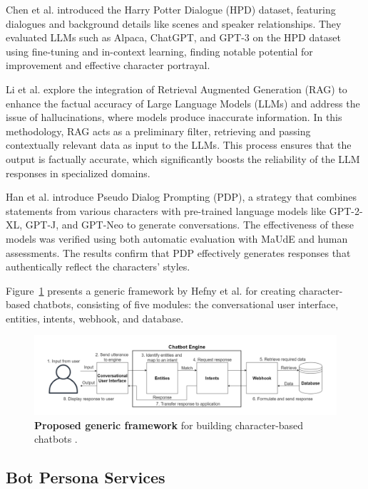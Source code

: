 \documentclass[fleqn,moreauthors,10pt]{ds_report}
\begin{document}
Chen et al. \cite{chen2023large} introduced the Harry Potter Dialogue (HPD) dataset, featuring dialogues and background details like scenes and speaker relationships. They evaluated LLMs such as Alpaca, ChatGPT, and GPT-3 on the HPD dataset using fine-tuning and in-context learning, finding notable potential for improvement and effective character portrayal.

Li et al. \cite{li2024enhancing} explore the integration of Retrieval Augmented Generation (RAG) to enhance the factual accuracy of Large Language Models (LLMs) and address the issue of hallucinations, where models produce inaccurate information. In this methodology, RAG acts as a preliminary filter, retrieving and passing contextually relevant data as input to the LLMs. This process ensures that the output is factually accurate, which significantly boosts the reliability of the LLM responses in specialized domains.

Han et al. \cite{han2022meet} introduce Pseudo Dialog Prompting (PDP), a strategy that combines statements from various characters with pre-trained language models like GPT-2-XL, GPT-J, and GPT-Neo to generate conversations. The effectiveness of these models was verified using both automatic evaluation with MaUdE and human assessments. The results confirm that PDP effectively generates responses that authentically reflect the characters' styles.

Figure~\ref{fig:generic_framework} presents a generic framework by Hefny et al. \cite{generic_framework} for creating character-based chatbots, consisting of five modules: the conversational user interface, entities, intents, webhook, and database.

\begin{figure}[ht]
        \centering 
	\includegraphics[width=\linewidth]{fig/general_framework_from_article.png}
	\caption{\textbf{Proposed generic framework} for building character-based chatbots \cite{generic_framework}.}
	\label{fig:generic_framework}
\end{figure}

\subsection*{Bot Persona Services}
\end{document}
